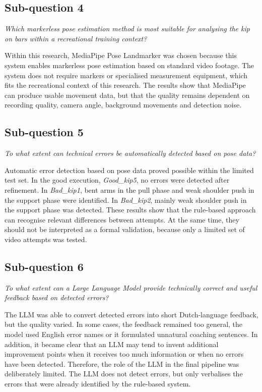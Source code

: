 \subsection{Sub-question 4}

\textit{Which markerless pose estimation method is most suitable for analysing the kip on bars within a recreational training context?}

Within this research, MediaPipe Pose Landmarker was chosen because this system enables markerless pose estimation based on standard video footage. The system does not require markers or specialised measurement equipment, which fits the recreational context of this research. The results show that MediaPipe can produce usable movement data, but that the quality remains dependent on recording quality, camera angle, background movements and detection noise.

\subsection{Sub-question 5}

\textit{To what extent can technical errors be automatically detected based on pose data?}

Automatic error detection based on pose data proved possible within the limited test set. In the good execution, \textit{Good\_kip5}, no errors were detected after refinement. In \textit{Bad\_kip1}, bent arms in the pull phase and weak shoulder push in the support phase were identified. In \textit{Bad\_kip2}, mainly weak shoulder push in the support phase was detected. These results show that the rule-based approach can recognise relevant differences between attempts. At the same time, they should not be interpreted as a formal validation, because only a limited set of video attempts was tested.

\subsection{Sub-question 6}

\textit{To what extent can a Large Language Model provide technically correct and useful feedback based on detected errors?}

The LLM was able to convert detected errors into short Dutch-language feedback, but the quality varied. In some cases, the feedback remained too general, the model used English error names or it formulated unnatural coaching sentences. In addition, it became clear that an LLM may tend to invent additional improvement points when it receives too much information or when no errors have been detected. Therefore, the role of the LLM in the final pipeline was deliberately limited. The LLM does not detect errors, but only verbalises the errors that were already identified by the rule-based system.

